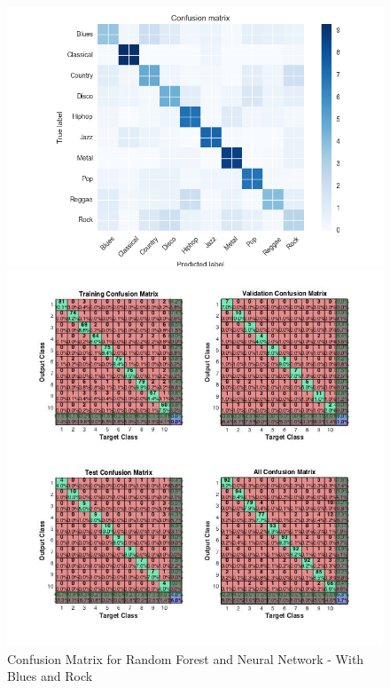 \documentclass{article} %
\begin{document}
\begin{figure}[!ht]
\begin{center}
\caption{Confusion Matrix for Random Forest and Neural Network - With Blues and Rock}
\begin{minipage}[b]{0.45\linewidth}
	\includegraphics[scale=0.45]{ConfusionMatrix-RandomForest.png}
\end{minipage}
\quad
\begin{minipage}[b]{0.45\linewidth}
	\includegraphics[scale=0.35]{ConfusionMatrix-NN.jpg}
\end{minipage}
\end{center}
\end{figure}
\end{document}
